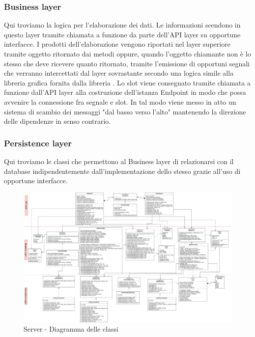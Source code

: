 	\subsubsection{Business layer}
		Qui troviamo la logica per l'elaborazione dei dati. Le informazioni scendono in questo layer tramite chiamata a funzione da parte dell'API layer su opportune interfacce. I prodotti dell'elaborazione vengono riportati nel layer superiore tramite oggetto ritornato dai metodi oppure, quando l'oggetto chiamante non è lo stesso che deve ricevere quanto ritornato, tramite l'emissione di opportuni segnali che verranno intercettati dal layer sovrastante secondo una logica  simile alla libreria grafica  fornita dalla libreria . Lo slot viene consegnato tramite chiamata a funzione dall'API layer alla costruzione dell'istanza Endpoint in modo che possa avvenire la connessione fra segnale e slot. In tal modo viene messo in atto un sistema di scambio dei messaggi "dal basso verso l'alto" mantenendo la direzione delle dipendenze in senso contrario.

	\subsubsection{Persistence layer}
		Qui troviamo le classi che permettono al Business layer di relazionarsi con il database indipendentemente dall'implementazione dello stesso grazie all'uso di opportune interfacce.

		\begin{landscape}
			\begin{figure}[h!]
				\includegraphics[width=26cm]{img/server_classi.png}
				\caption{Server - Diagramma delle classi}
			\end{figure}
		\end{landscape}

